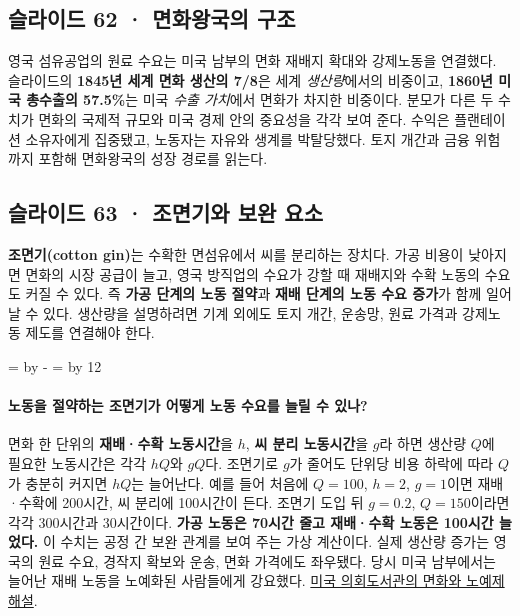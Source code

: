 \documentclass[10pt,a4paper]{article}
\newcommand{\ReserveQuestionSpace}{%
  \par\begingroup
  \dimen0=\pagegoal \advance\dimen0 by -\pagetotal
  \dimen2=\baselineskip \multiply\dimen2 by 12
  \ifdim\dimen0<\dimen2 \newpage\fi
  \endgroup}
\begin{document}
\subsection{슬라이드 62 · 면화왕국의 구조}
영국 섬유공업의 원료 수요는 미국 남부의 면화 재배지 확대와 강제노동을 연결했다. 슬라이드의 \textbf{1845년 세계 면화 생산의 7/8}은 세계 \emph{생산량}에서의 비중이고, \textbf{1860년 미국 총수출의 57.5\%}는 미국 \emph{수출 가치}에서 면화가 차지한 비중이다. 분모가 다른 두 수치가 면화의 국제적 규모와 미국 경제 안의 중요성을 각각 보여 준다. 수익은 플랜테이션 소유자에게 집중됐고, 노동자는 자유와 생계를 박탈당했다. 토지 개간과 금융 위험까지 포함해 면화왕국의 성장 경로를 읽는다.\par

\subsection{슬라이드 63 · 조면기와 보완 요소}
\textbf{조면기(cotton gin)}는 수확한 면섬유에서 씨를 분리하는 장치다. 가공 비용이 낮아지면 면화의 시장 공급이 늘고, 영국 방직업의 수요가 강할 때 재배지와 수확 노동의 수요도 커질 수 있다. 즉 \textbf{가공 단계의 노동 절약}과 \textbf{재배 단계의 노동 수요 증가}가 함께 일어날 수 있다. 생산량을 설명하려면 기계 외에도 토지 개간, 운송망, 원료 가격과 강제노동 제도를 연결해야 한다.\par

\ReserveQuestionSpace
\paragraph{노동을 절약하는 조면기가 어떻게 노동 수요를 늘릴 수 있나?}
면화 한 단위의 \textbf{재배·수확 노동시간}을 $h$, \textbf{씨 분리 노동시간}을 $g$라 하면 생산량 $Q$에 필요한 노동시간은 각각 $hQ$와 $gQ$다. 조면기로 $g$가 줄어도 단위당 비용 하락에 따라 $Q$가 충분히 커지면 $hQ$는 늘어난다. 예를 들어 처음에 $Q=100$, $h=2$, $g=1$이면 재배·수확에 200시간, 씨 분리에 100시간이 든다. 조면기 도입 뒤 $g=0.2$, $Q=150$이라면 각각 300시간과 30시간이다. \textbf{가공 노동은 70시간 줄고 재배·수확 노동은 100시간 늘었다.} 이 수치는 공정 간 보완 관계를 보여 주는 가상 계산이다. 실제 생산량 증가는 영국의 원료 수요, 경작지 확보와 운송, 면화 가격에도 좌우됐다. 당시 미국 남부에서는 늘어난 재배 노동을 노예화된 사람들에게 강요했다. \href{https://www.loc.gov/classroom-materials/united-states-history-primary-source-timeline/national-expansion-and-reform-1815-1880/pre-civil-war-african-american-slavery/}{미국 의회도서관의 면화와 노예제 해설}.\par
\end{document}
